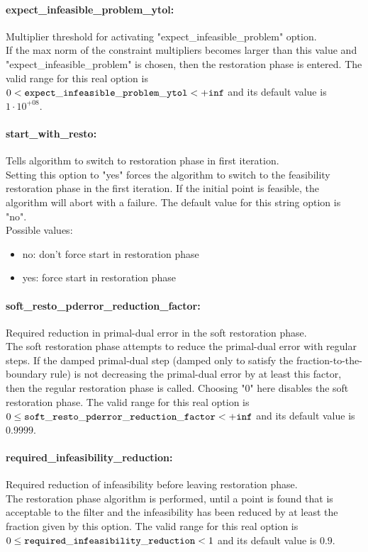 \paragraph{expect\_infeasible\_problem\_ytol:}\label{opt:expect_infeasible_problem_ytol} Multiplier threshold for activating "expect\_infeasible\_problem" option. \\
 If the max norm of the constraint multipliers
becomes larger than this value and
"expect\_infeasible\_problem" is chosen, then the
restoration phase is entered. The valid range for this real option is 
$0 <  {\tt expect\_infeasible\_problem\_ytol } <  {\tt +inf}$
and its default value is $1 \cdot 10^{+08}$.


\paragraph{start\_with\_resto:}\label{opt:start_with_resto} Tells algorithm to switch to restoration phase in first iteration. \\
 Setting this option to "yes" forces the algorithm
to switch to the feasibility restoration phase in
the first iteration. If the initial point is
feasible, the algorithm will abort with a failure. The default value for this string option is "no".
\\ 
Possible values:
\begin{itemize}
   \item no: don't force start in restoration phase
   \item yes: force start in restoration phase
\end{itemize}

\paragraph{soft\_resto\_pderror\_reduction\_factor:}\label{opt:soft_resto_pderror_reduction_factor} Required reduction in primal-dual error in the soft restoration phase. \\
 The soft restoration phase attempts to reduce the
primal-dual error with regular steps. If the
damped primal-dual step (damped only to satisfy
the fraction-to-the-boundary rule) is not
decreasing the primal-dual error by at least this
factor, then the regular restoration phase is
called. Choosing "0" here disables the soft
restoration phase. The valid range for this real option is 
$0 \le {\tt soft\_resto\_pderror\_reduction\_factor } <  {\tt +inf}$
and its default value is $0.9999$.


\paragraph{required\_infeasibility\_reduction:}\label{opt:required_infeasibility_reduction} Required reduction of infeasibility before leaving restoration phase. \\
 The restoration phase algorithm is performed,
until a point is found that is acceptable to the
filter and the infeasibility has been reduced by
at least the fraction given by this option. The valid range for this real option is 
$0 \le {\tt required\_infeasibility\_reduction } <  1$
and its default value is $0.9$.


